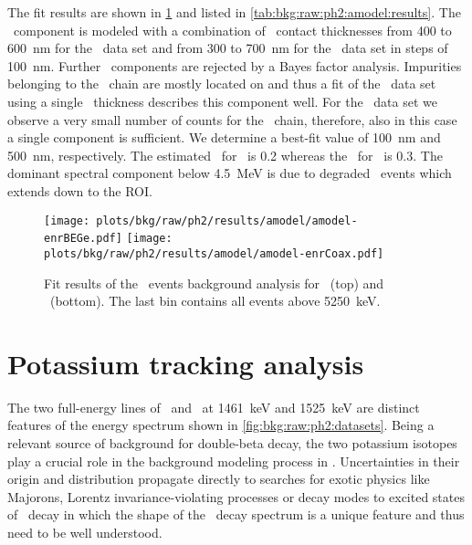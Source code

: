 The fit results are shown in \cref{fig:bkg:raw:ph2:amodel:resultsplot} and listed in
\cref{tab:bkg:raw:ph2:amodel:results}. The \Po\ component is modeled with a combination of
\pplus\ contact thicknesses from 400 to 600~nm for the \enrBEGeII\ data set and from 300
to 700~nm for the \enrCoaxII\ data set in steps of 100~nm. Further \Po\ components are
rejected by a Bayes factor analysis.  Impurities belonging to the \Ra\ chain are mostly
located on  and thus a fit of the \enrCoaxII\ data set using a single \pplus\
thickness describes this component well. For the \enrBEGeII\ data set we observe a very
small number of counts for the \Ra\ chain, therefore, also in this case a single component
is sufficient. We determine a best-fit value of 100~nm and 500~nm, respectively. The
estimated \pvalue\ for \enrBEGeII\ is 0.2 whereas the \pvalue\ for \enrCoaxII\ is 0.3. The
dominant spectral component below 4.5~MeV is due to degraded \a\ events which extends down
to the ROI.

\begin{figure}
  \centering
  \texttt{[image: plots/bkg/raw/ph2/results/amodel/amodel-enrBEGe.pdf]}
  \texttt{[image: plots/bkg/raw/ph2/results/amodel/amodel-enrCoax.pdf]}
  \caption{%
    Fit results of the \a\ events background analysis for \enrBEGeII\
    (top) and \enrCoaxII\ (bottom). The last bin contains all events above
    5250~keV.
  }\label{fig:bkg:raw:ph2:amodel:resultsplot}
\end{figure}

\begin{table}
\centering
  \caption{%
    Fit results of the \a\ events background analysis for the
    \enrBEGeII\ and \enrCoaxII\ data sets. Values are given in counts in the
    full pdf range from 40~keV to 8000~keV.
  }\label{tab:bkg:raw:ph2:amodel:results}
  
\end{table}


\section{Potassium tracking analysis}%
\label{sec:bkg:raw:ph2:kmodel}

The two full-energy lines of \kvn\ and \kvz\ at 1461~keV and 1525~keV are distinct
features of the energy spectrum shown in \cref{fig:bkg:raw:ph2:datasets}. Being a relevant
source of background for double-beta decay, the two potassium isotopes play a crucial role
in the background modeling process in \gerda. Uncertainties in their origin and
distribution propagate directly to searches for exotic physics like Majorons, Lorentz
invariance-violating processes or decay modes to excited states of \nnbb\ decay in which
the shape of the \nnbb\ decay spectrum is a unique feature and thus need to be well
understood.

